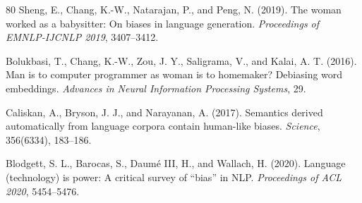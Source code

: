 \documentclass[11pt,a4paper]{article}
\begin{document}
\begin{thebibliography}{80}
Sheng, E., Chang, K.-W., Natarajan, P., and Peng, N. (2019). The woman worked as a babysitter: On biases in language generation. \textit{Proceedings of EMNLP-IJCNLP 2019}, 3407--3412.

Bolukbasi, T., Chang, K.-W., Zou, J. Y., Saligrama, V., and Kalai, A. T. (2016). Man is to computer programmer as woman is to homemaker? Debiasing word embeddings. \textit{Advances in Neural Information Processing Systems}, 29.

Caliskan, A., Bryson, J. J., and Narayanan, A. (2017). Semantics derived automatically from language corpora contain human-like biases. \textit{Science}, 356(6334), 183--186.

Blodgett, S. L., Barocas, S., Daum\'e III, H., and Wallach, H. (2020). Language (technology) is power: A critical survey of ``bias'' in NLP. \textit{Proceedings of ACL 2020}, 5454--5476.
\end{thebibliography}
\end{document}
